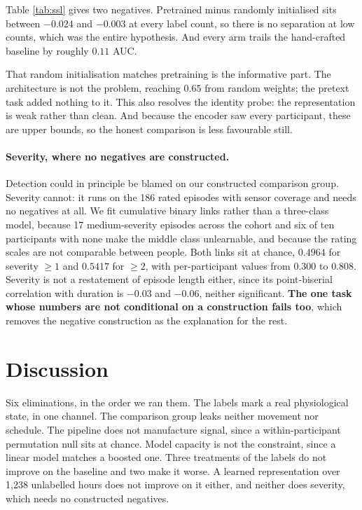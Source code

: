 Table \ref{tab:ssl} gives two negatives. Pretrained minus randomly initialised
sits between $-0.024$ and $-0.003$ at every label count, so there is no
separation at low counts, which was the entire hypothesis. And every arm trails
the hand-crafted baseline by roughly $0.11$ AUC.

That random initialisation matches pretraining is the informative part. The
architecture is not the problem, reaching $0.65$ from random weights; the
pretext task added nothing to it. This also resolves the identity probe: the
representation is weak rather than clean. And because the encoder saw every
participant, these are upper bounds, so the honest comparison is less
favourable still.

\paragraph{Severity, where no negatives are constructed.} Detection could in
principle be blamed on our constructed comparison group. Severity cannot: it
runs on the 186 rated episodes with sensor coverage and needs no negatives at
all. We fit cumulative binary links rather than a three-class model, because 17
medium-severity episodes across the cohort and six of ten participants with
none make the middle class unlearnable, and because the rating scales are not
comparable between people. Both links sit at chance, $0.4964$ for severity
$\geq 1$ and $0.5417$ for $\geq 2$, with per-participant values from $0.300$ to
$0.808$. Severity is not a restatement of episode length either, since its
point-biserial correlation with duration is $-0.03$ and $-0.06$, neither
significant. \textbf{The one task whose numbers are not conditional on a
construction fails too}, which removes the negative construction as the
explanation for the rest.

\section{Discussion}

Six eliminations, in the order we ran them. The labels mark a real
physiological state, in one channel. The comparison group leaks neither
movement nor schedule. The pipeline does not manufacture signal, since a
within-participant permutation null sits at chance. Model capacity is not the
constraint, since a linear model matches a boosted one. Three treatments of the
labels do not improve on the baseline and two make it worse. A learned
representation over 1{,}238 unlabelled hours does not improve on it either, and
neither does severity, which needs no constructed negatives.

